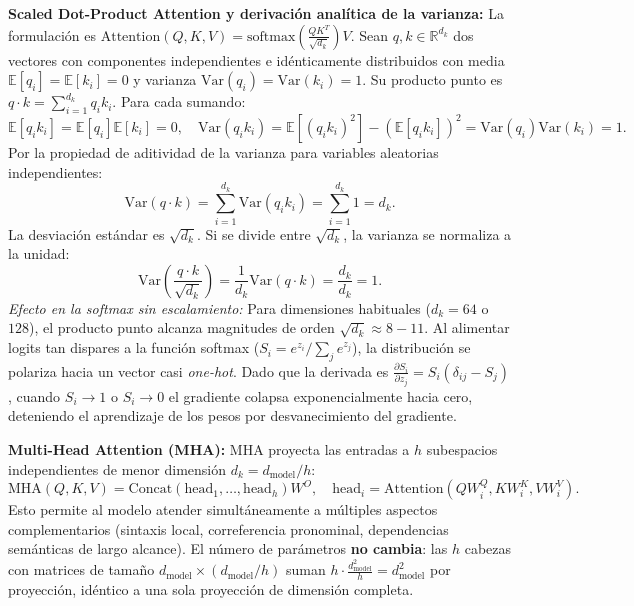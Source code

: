\documentclass[10pt,letterpaper]{article}
\begin{document}
\textbf{Scaled Dot-Product Attention y derivación analítica de la varianza:}
La formulación es $\mathrm{Attention}(Q, K, V) = \mathrm{softmax}\left(\frac{Q K^T}{\sqrt{d_k}}\right) V$.
Sean $q, k \in \mathbb{R}^{d_k}$ dos vectores con componentes independientes e idénticamente distribuidos con media $\mathbb{E}[q_i]=\mathbb{E}[k_i]=0$ y varianza $\mathrm{Var}(q_i)=\mathrm{Var}(k_i)=1$. Su producto punto es $q \cdot k = \sum_{i=1}^{d_k} q_i k_i$. Para cada sumando:
\begin{equation}
    \mathbb{E}[q_i k_i] = \mathbb{E}[q_i]\mathbb{E}[k_i] = 0, \quad \mathrm{Var}(q_i k_i) = \mathbb{E}[(q_i k_i)^2] - (\mathbb{E}[q_i k_i])^2 = \mathrm{Var}(q_i)\mathrm{Var}(k_i) = 1.
\end{equation}
Por la propiedad de aditividad de la varianza para variables aleatorias independientes:
\begin{equation}
    \mathrm{Var}(q \cdot k) = \sum_{i=1}^{d_k} \mathrm{Var}(q_i k_i) = \sum_{i=1}^{d_k} 1 = d_k.
\end{equation}
La desviación estándar es $\sqrt{d_k}$. Si se divide entre $\sqrt{d_k}$, la varianza se normaliza a la unidad:
\begin{equation}
    \mathrm{Var}\left(\frac{q \cdot k}{\sqrt{d_k}}\right) = \frac{1}{d_k}\mathrm{Var}(q \cdot k) = \frac{d_k}{d_k} = 1.
\end{equation}
\textit{Efecto en la softmax sin escalamiento:} Para dimensiones habituales ($d_k=64$ o $128$), el producto punto alcanza magnitudes de orden $\sqrt{d_k} \approx 8 - 11$. Al alimentar logits tan dispares a la función softmax ($S_i = e^{z_i}/\sum_j e^{z_j}$), la distribución se polariza hacia un vector casi \textit{one-hot}. Dado que la derivada es $\frac{\partial S_i}{\partial z_j} = S_i(\delta_{ij} - S_j)$, cuando $S_i \to 1$ o $S_i \to 0$ el gradiente colapsa exponencialmente hacia cero, deteniendo el aprendizaje de los pesos por desvanecimiento del gradiente.

\textbf{Multi-Head Attention (MHA):}
MHA proyecta las entradas a $h$ subespacios independientes de menor dimensión $d_k = d_{\text{model}}/h$:
\begin{equation}
    \mathrm{MHA}(Q, K, V) = \mathrm{Concat}(\mathrm{head}_1, \dots, \mathrm{head}_h) W^O, \quad \mathrm{head}_i = \mathrm{Attention}(Q W_i^Q, K W_i^K, V W_i^V).
\end{equation}
Esto permite al modelo atender simultáneamente a múltiples aspectos complementarios (sintaxis local, correferencia pronominal, dependencias semánticas de largo alcance). El número de parámetros \textbf{no cambia}: las $h$ cabezas con matrices de tamaño $d_{\text{model}} \times (d_{\text{model}}/h)$ suman $h \cdot \frac{d_{\text{model}}^2}{h} = d_{\text{model}}^2$ por proyección, idéntico a una sola proyección de dimensión completa.
\end{document}
